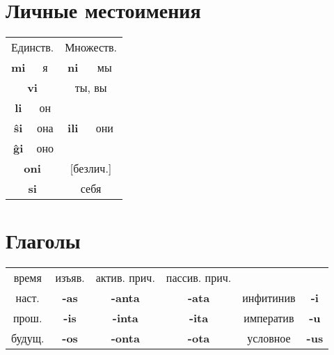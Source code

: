 \documentclass{article}
\def\b#1{\textbf{#1}}
\begin{document}
\section{Личные местоимения}

\begin{tabular}{cccc}
\multicolumn{2}{c}{Единств.} & \multicolumn{2}{c}{Множеств.} \\
\b{mi} & я & \b{ni} & мы \\
\multicolumn{2}{c}{\b{vi}} & \multicolumn{2}{c}{ты, вы} \\
\b{li} & он & & \\
\b{ŝi} & она & \b{ili} & они \\
\b{ĝi} & оно & & \\	 
\multicolumn{2}{c}{\b{oni}} & \multicolumn{2}{c}{[безлич.]} \\
\multicolumn{2}{c}{\b{si}} & \multicolumn{2}{c}{себя} \\
\end{tabular}

\section{Глаголы}

\begin{tabular}{cccccc}
время & изъяв. & актив. прич. & пассив. прич. & ~ & ~ \\
наст. & \b{-as} & \b{-anta} & \b{-ata} & инфитинив & \b{-i} \\
прош. & \b{-is} & \b{-inta} & \b{-ita} & императив & \b{-u} \\
будущ. & \b{-os} & \b{-onta} & \b{-ota} & условное & \b{-us} \\
\end{tabular}
\end{document}
